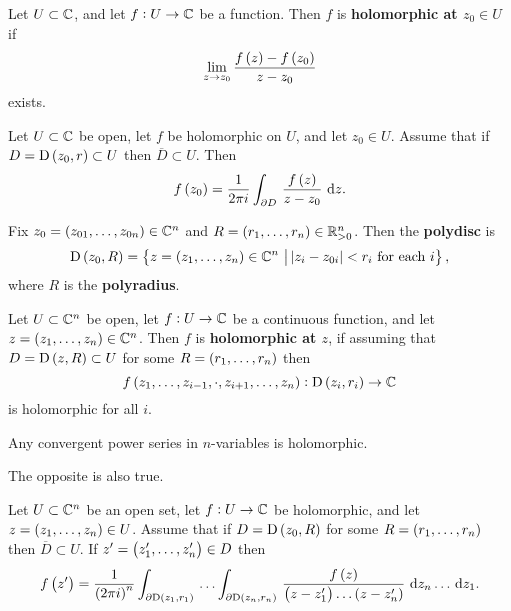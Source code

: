 \begin{definition}
Let $ U \subset \mathbb{C} $, and let $ f : U \to \mathbb{C} $ be a function. Then $ f $ is \textbf{holomorphic at $ z_0 \in U $} if
$$ \lim_{z \to z_0} \dfrac{f\br{z} - f\br{z_0}}{z - z_0} $$
exists.
\end{definition}

\begin{theorem}[Cauchy]
\label{thm:2.3}
Let $ U \subset \mathbb{C} $ be open, let $ f $ be holomorphic on $ U $, and let $ z_0 \in U $. Assume that if $ D = \D\br{z_0, r} \subset U $ then $ \overline{D} \subset U $. Then
$$ f\br{z_0} = \dfrac{1}{2\pi i}\intd{\partial D}{}{\dfrac{f\br{z}}{z - z_0}}{z}. $$
\end{theorem}

\begin{notation}
Fix $ z_0 = \br{z_{01}, \dots, z_{0n}} \in \CC^n $ and $ R = \br{r_1, \dots, r_n} \in \RR_{> 0}^n $. Then the \textbf{polydisc} is
$$ \D\br{z_0, R} = \cbr{z = \br{z_1, \dots, z_n} \in \CC^n \st \abs{z_i - z_{0i}} < r_i \ \text{for each} \ i}, $$
where $ R $ is the \textbf{polyradius}.
\end{notation}

\begin{definition}
Let $ U \subset \mathbb{C}^n $ be open, let $ f : U \to \mathbb{C} $ be a continuous function, and let $ z = \br{z_1, \dots, z_n} \in \CC^n $. Then $ f $ is \textbf{holomorphic at $ z $}, if assuming that $ D = \D\br{z, R} \subset U $ for some $ R = \br{r_1, \dots, r_n} $ then
$$ f\br{z_1, \dots, z_{i - 1}, \cdot, z_{i + 1}, \dots, z_n} : \D\br{z_i, r_i} \to \CC $$
is holomorphic for all $ i $.
\end{definition}

\begin{example}
Any convergent power series in $ n $-variables is holomorphic.
\end{example}

The opposite is also true.

\begin{theorem}[Cauchy]
\label{thm:2.7}
Let $ U \subset \mathbb{C}^n $ be an open set, let $ f : U \to \mathbb{C} $ be holomorphic, and let $ z = \br{z_1, \dots, z_n} \in U $. Assume that if $ D = \D\br{z_0, R} $ for some $ R = \br{r_1, \dots, r_n} $ then $ \overline{D} \subset U $. If $ z' = \br{z_1', \dots, z_n'} \in D $ then
$$ f\br{z'} = \dfrac{1}{\br{2\pi i}^n}\intd{\partial\D\br{z_1, r_1}}{}{\dots \intd{\partial\D\br{z_n, r_n}}{}{\dfrac{f\br{z}}{\br{z - z_1'} \dots \br{z - z_n'}}}{z_n \dots}}{z_1}. $$
\end{theorem}

